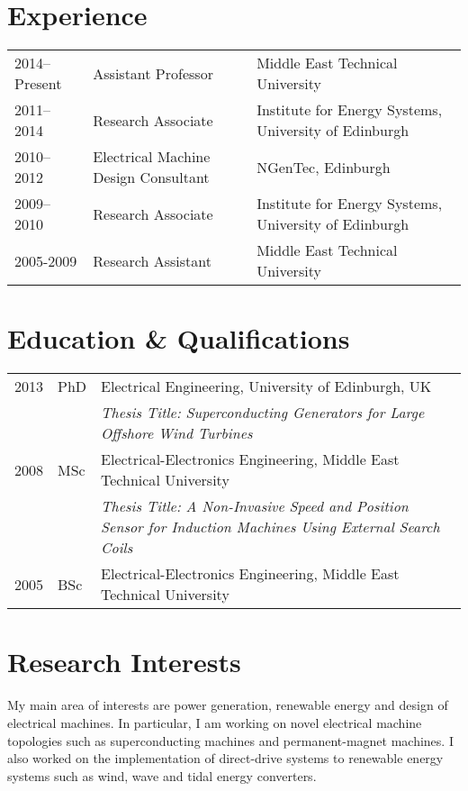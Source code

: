 \documentclass[a4paper,12pt]{article}
\begin{document}
\maketitle

\section{Experience}

\begin{tabular}{lp{3.6cm}l}
2014--Present & Assistant Professor & Middle East Technical University \\ 
2011--2014 & Research Associate & Institute for Energy Systems, University of Edinburgh \\ 
2010--2012 & Electrical Machine Design Consultant & NGenTec, Edinburgh\\
2009--2010 & Research Associate & Institute for Energy Systems, University of Edinburgh\\
2005-2009 & Research Assistant & Middle East Technical University\\ 
\end{tabular}
 
\section{Education \& Qualifications}
\begin{tabular}{llp{12cm}}
 2013 & PhD & Electrical Engineering, University of Edinburgh, UK\\  
& & \textit{Thesis Title: Superconducting Generators for Large Offshore Wind Turbines} \\ 
 2008 & MSc & Electrical-Electronics Engineering, Middle East Technical University \\
& & \textit{Thesis Title: A Non-Invasive Speed and Position Sensor for Induction Machines Using External Search Coils}\\
 2005 & BSc & Electrical-Electronics Engineering, Middle East Technical University \\

\end{tabular}




\section{Research Interests}

My main area of interests are power generation, renewable energy and design of electrical machines. In particular, I am working on novel electrical machine topologies such as superconducting machines and permanent-magnet machines. I also worked on the implementation of direct-drive systems to renewable energy systems such as wind, wave and tidal energy converters.
\end{document}
